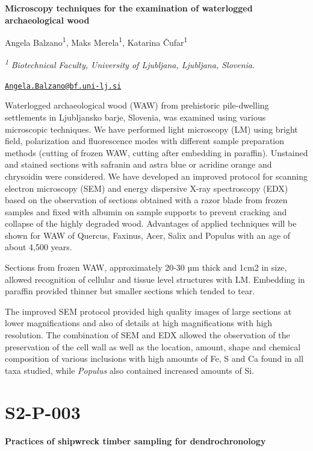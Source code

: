 \documentclass[
]{book}
\begin{document}
\textbf{Microscopy techniques for the examination of waterlogged archaeological wood}

Angela Balzano\textsuperscript{1}, Maks Merela\textsuperscript{1}, Katarina Čufar\textsuperscript{1}

\textsuperscript{\emph{1}} \emph{Biotechnical Faculty, University of Ljubljana, Ljubljana, Slovenia.}

\href{mailto:Angela.Balzano@bf.uni-lj.si}{\nolinkurl{Angela.Balzano@bf.uni-lj.si}}

Waterlogged archaeological wood (WAW) from prehistoric pile-dwelling settlements in Ljubljansko barje, Slovenia, was examined using various microscopic techniques. We have performed light microscopy (LM) using bright field, polarization and fluorescence modes with different sample preparation methods (cutting of frozen WAW, cutting after embedding in paraffin). Unstained and stained sections with safranin and astra blue or acridine orange and chrysoidin were considered. We have developed an improved protocol for scanning electron microscopy (SEM) and energy dispersive X-ray spectroscopy (EDX) based on the observation of sections obtained with a razor blade from frozen samples and fixed with albumin on sample supports to prevent cracking and collapse of the highly degraded wood. Advantages of applied techniques will be shown for WAW of Quercus, Faxinus, Acer, Salix and Populus with an age of about 4,500 years.

Sections from frozen WAW, approximately 20-30 µm thick and 1cm2 in size, allowed recognition of cellular and tissue level structures with LM. Embedding in paraffin provided thinner but smaller sections which tended to tear.

The improved SEM protocol provided high quality images of large sections at lower magnifications and also of details at high magnifications with high resolution. The combination of SEM and EDX allowed the observation of the preservation of the cell wall as well as the location, amount, shape and chemical composition of various inclusions with high amounts of Fe, S and Ca found in all taxa studied, while \emph{Populus} also contained increased amounts of Si.

\hypertarget{s2-p-003}{%
\section*{S2-P-003}\label{s2-p-003}}

\textbf{Practices of shipwreck timber sampling for dendrochronology}
\end{document}
